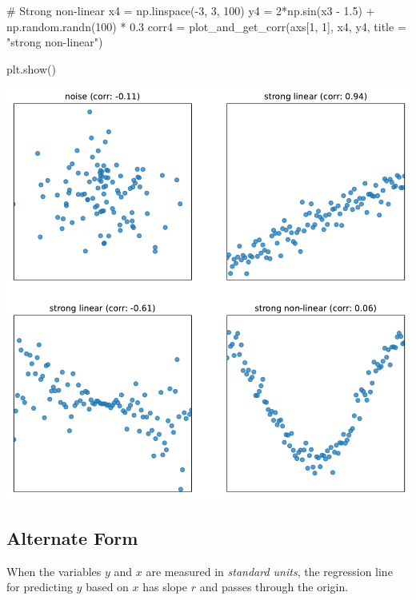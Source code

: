 \documentclass[
  letterpaper,
  DIV=11,
  numbers=noendperiod]{scrreprt}
\newenvironment{Shaded}{\begin{snugshade}}{\end{snugshade}}
\newcommand{\CommentTok}[1]{\textcolor[rgb]{0.37,0.37,0.37}{#1}}
\newcommand{\DecValTok}[1]{\textcolor[rgb]{0.68,0.00,0.00}{#1}}
\newcommand{\FloatTok}[1]{\textcolor[rgb]{0.68,0.00,0.00}{#1}}
\newcommand{\NormalTok}[1]{\textcolor[rgb]{0.00,0.23,0.31}{#1}}
\newcommand{\OperatorTok}[1]{\textcolor[rgb]{0.37,0.37,0.37}{#1}}
\newcommand{\StringTok}[1]{\textcolor[rgb]{0.13,0.47,0.30}{#1}}
\begin{document}
\begin{Shaded}
\begin{Highlighting}[]
\CommentTok{\# Strong non{-}linear}
\NormalTok{x4 }\OperatorTok{=}\NormalTok{ np.linspace(}\OperatorTok{{-}}\DecValTok{3}\NormalTok{, }\DecValTok{3}\NormalTok{, }\DecValTok{100}\NormalTok{)}
\NormalTok{y4 }\OperatorTok{=} \DecValTok{2}\OperatorTok{*}\NormalTok{np.sin(x3 }\OperatorTok{{-}} \FloatTok{1.5}\NormalTok{) }\OperatorTok{+}\NormalTok{ np.random.randn(}\DecValTok{100}\NormalTok{) }\OperatorTok{*} \FloatTok{0.3}
\NormalTok{corr4 }\OperatorTok{=}\NormalTok{ plot\_and\_get\_corr(axs[}\DecValTok{1}\NormalTok{, }\DecValTok{1}\NormalTok{], x4, y4, title }\OperatorTok{=} \StringTok{"strong non{-}linear"}\NormalTok{)}

\NormalTok{plt.show()}
\end{Highlighting}
\end{Shaded}

\includegraphics{intro_to_modeling/intro_to_modeling_files/figure-pdf/cell-3-output-1.pdf}

\subsection{Alternate Form}\label{alternate-form}

When the variables \(y\) and \(x\) are measured in \emph{standard
units}, the regression line for predicting \(y\) based on \(x\) has
slope \(r\) and passes through the origin.
\end{document}
